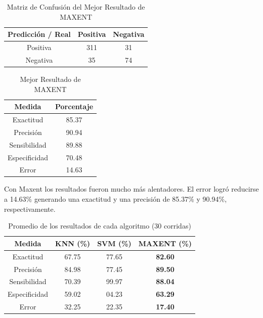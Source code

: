 \documentclass[hidelinks]{sig-alternate-05-2015}
\begin{document}
\begin{table}[H]
\centering
\caption{Matriz de Confusión del Mejor Resultado de MAXENT}
\begin{tabular}{|c|c|c|} 					\hline
Predicción / Real	& Positiva 	& Negativa 	\\ \hline
Positiva 			& 311 		& 31 		\\ \hline
Negativa 			& 35 		& 74		\\
\hline\end{tabular}
\label{table:MC-MAXENT}
\end{table}


\begin{table}[H]
\centering
\caption{Mejor Resultado de MAXENT}
\begin{tabular}{|c|c|} 			\hline
Medida  		& Porcentaje 	\\ \hline
Exactitud 		& 85.37			\\ \hline
Precisión 		& 90.94			\\ \hline
Sensibilidad 	& 89.88			\\ \hline
Especificidad	& 70.48			\\ \hline
Error			& 14.63 		\\
\hline\end{tabular}
\label{table:MAXENT}
\end{table}

Con Maxent los resultados fueron mucho más alentadores. El error logró reducirse a 14.63$\%$ generando una exactitud y una precisión de 85.37$\%$ y 90.94$\%$, respectivamente.

\vspace*{1\baselineskip}

\begin{table}
\centering
\caption{Promedio de los resultados de cada algoritmo (30 corridas)}
\begin{tabular}{|c|c|c|c|} 								\hline
Medida  		& KNN (\%)	& SVM (\%)	& MAXENT (\%)	\\ \hline
Exactitud 		& 67.75		& 77.65		& \textbf{82.60} \\ \hline
Precisión 		& 84.98 	& 77.45 	& \textbf{89.50}			\\ \hline
Sensibilidad 	& 70.39 	& 99.97 	& \textbf{88.04}			\\ \hline
Especificidad	& 59.02 	& 04.23 	& \textbf{63.29}			\\ \hline
Error			& 32.25		& 22.35		& \textbf{17.40}			\\
\hline\end{tabular}
\label{table:RESULTS}
\end{table}
\end{document}

